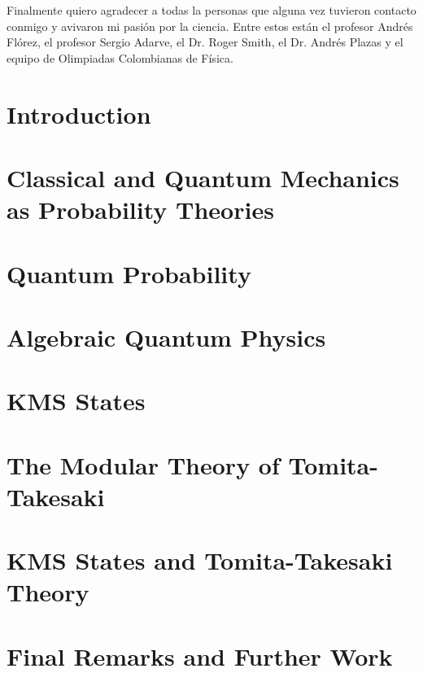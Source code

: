 \documentclass[12pt]{report}
\theoremstyle{definition}
\begin{document}
Finalmente quiero agradecer a todas la personas que alguna vez tuvieron contacto conmigo y avivaron mi pasión por la ciencia. Entre estos están el profesor Andrés Flórez, el profesor Sergio Adarve, el Dr. Roger Smith, el Dr. Andrés Plazas y el equipo de Olimpiadas Colombianas de Física. 

\tableofcontents

\chapter{Introduction}


\chapter{Classical and Quantum Mechanics as Probability Theories}\label{chp:axiom}


\chapter{Quantum Probability}\label{chp:logic}


\chapter{Algebraic Quantum Physics}\label{chp:algebra}


\chapter{KMS States}\label{chp:KMS}


\chapter{The Modular Theory of Tomita-Takesaki}\label{chp:tomita}


\chapter{KMS States and Tomita-Takesaki Theory}\label{chp:final}


\chapter{Final Remarks and Further Work}




\end{document}
